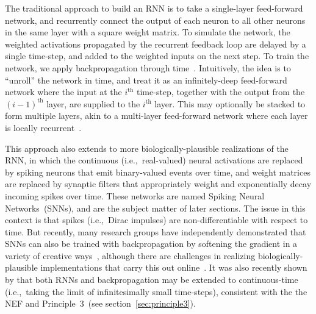 The traditional approach to build an RNN is to take a single-layer feed-forward network, and recurrently connect the output of each neuron to all other neurons in the same layer with a square weight matrix.
To simulate the network, the weighted activations propagated by the recurrent feedback loop are delayed by a single time-step, and added to the weighted inputs on the next step.
To train the network, we apply backpropagation through time~\citep[BPTT;][]{werbos1990backpropagation}.
Intuitively, the idea is to ``unroll'' the network in time, and treat it as an infinitely-deep feed-forward network where the input at the $i^\text{th}$ time-step, together with the output from the $(i-1)^\text{th}$ layer, are supplied to the $i^\text{th}$ layer.
This may optionally be stacked to form multiple layers, akin to a multi-layer feed-forward network where each layer is locally recurrent~\citep{pascanu2013construct}.

This approach also extends to more biologically-plausible realizations of the RNN, in which the continuous (i.e.,~real-valued) neural activations are replaced by spiking neurons that emit binary-valued events over time, and weight matrices are replaced by synaptic filters that appropriately weight and exponentially decay incoming spikes over time.
These networks are named Spiking Neural Networks~(SNNs), and are the subject matter of later sections.
The issue in this context is that spikes (i.e.,~Dirac impulses) are non-differentiable with respect to time.
But recently, many research groups have independently demonstrated that SNNs can also be trained with backpropagation by softening the gradient in a variety of creative ways~\citep{hunsberger2015spiking, hunsberger2016training, lee2016training, marblestone2016toward, neftci2017neuromorphic, bellec2018long, hunsberger2018, huh2018gradient, severa2018whetstone, rasmussen2018nengodl, shrestha2018slayer, neftci2019surrogate}, although there are challenges in realizing biologically-plausible implementations that carry this out online~\citep[][submitted]{hunsberger2018, stockel2019align}.
It was also recently shown by \citet{chen2018neural} that both RNNs and backpropagation may be extended to continuous-time (i.e.,~taking the limit of infinitesimally small time-steps), consistent with the the NEF and Principle~3~(see section~\ref{sec:principle3}).
 
